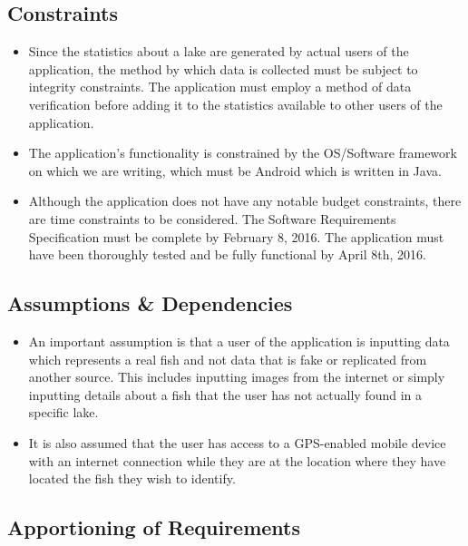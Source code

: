 \documentclass{article}
\begin{document}
\subsection{Constraints}
\begin{itemize}
	\item
	Since the statistics about a lake are generated by actual
	users of the application, the method by which data is collected
	must be subject to integrity constraints. The application must
	employ a method of data verification before adding it to the
	statistics available to other users of the application.

	\item
	The application's functionality is constrained by the OS/Software
	framework on which we are writing, which must be Android which is
	written in Java.

	\item
	Although the application does not have any notable budget constraints,
	there are time constraints to be considered. The Software Requirements
	Specification must be complete by February 8, 2016. The application must
	have been thoroughly tested and be fully functional by April 8th, 2016.
\end{itemize}

\subsection{Assumptions \& Dependencies}
\begin{itemize}
	\item
	An important assumption is that a user of the application is inputting
	data which represents a real fish and not data that is fake or replicated
	from another source. This includes inputting images from the internet or
	simply inputting details about a fish that the user has not actually found
	in a specific lake.

	\item
	It is also assumed that the user has access to a GPS-enabled mobile device
	with an internet connection while they are at the location where they have
	located the fish they wish to identify.
\end{itemize}

\subsection{Apportioning of Requirements}

\iffalse
Have not determined yet whether there are requirements that we be delayed until the future.
\fi
\end{document}
